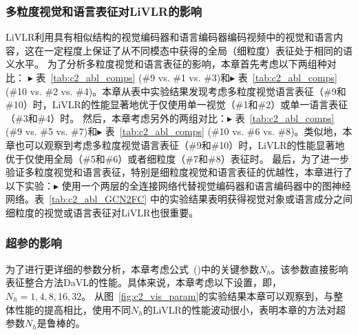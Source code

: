 \subsubsection{多粒度视觉和语言表征对LiVLR的影响}
LiVLR利用具有相似结构的视觉编码器和语言编码器编码视频中的视觉和语言内容，这在一定程度上保证了从不同模态中获得的全局（细粒度）表征处于相同的语义水平。
为了分析多粒度视觉和语言表征的影响，本章首先考虑以下两组种对比：
$\blacktriangleright$ 表~\ref{tab:c2_abl_comps} (\#9 vs. \#1 vs. \#3)和$\blacktriangleright$ 表~\ref{tab:c2_abl_comps} (\#10 vs. \#2 vs. \#4)。本章从表中实验结果发现考虑多粒度视觉语言表征（\#9和\#10）时，LiVLR的性能显著地优于仅使用单一视觉（\#1和\#2）或单一语言表征（\#3和\#4）时。
然后，本章考虑另外的两组对比：$\blacktriangleright$ 表~\ref{tab:c2_abl_comps} (\#9 vs. \#5 vs. \#7)和$\blacktriangleright$ 表~\ref{tab:c2_abl_comps} (\#10 vs. \#6 vs. \#8)。类似地，本章也可以观察到考虑多粒度视觉语言表征（\#9和\#10）时，LiVLR的性能显著地优于仅使用全局（\#5和\#6）或者细粒度（\#7和\#8）表征时。
最后，为了进一步验证多粒度视觉和语言表征，特别是细粒度视觉和语言表征的优越性，本章进行了以下实验：$\blacktriangleright$ 使用一个两层的全连接网络代替视觉编码器和语言编码器中的图神经网络。表~\ref{tab:c2_abl_GCN2FC} 中的实验结果表明获得视觉对象或语言成分之间细粒度的视觉或语言表征对LiVLR也很重要。



\subsubsection{超参的影响}
为了进行更详细的参数分析，本章考虑公式~()中的关键参数$N_h$。该参数直接影响表征整合方法DaVL的性能。具体来说，本章考虑以下设置，即，$N_h = 1, 4, 8, 16, 32$。
从图~\ref{fig:c2_vis_param}的实验结果本章可以观察到，与整体性能的提高相比，使用不同$N_h$的LiVLR的性能波动很小，表明本章的方法对超参数$N_h$是鲁棒的。



